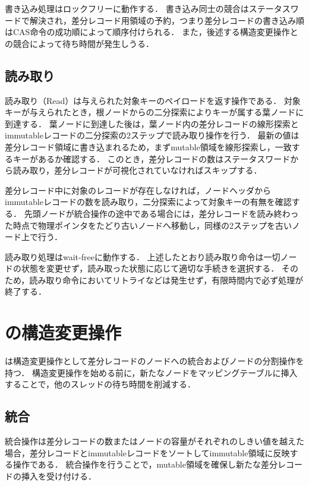 書き込み処理はロックフリーに動作する．
書き込み同士の競合はステータスワードで解決され，差分レコード用領域の予約，つまり差分レコードの書き込み順はCAS命令の成功順によって順序付けられる．
また，後述する構造変更操作との競合によって待ち時間が発生しうる．

\subsection{読み取り}

読み取り（Read）は与えられた対象キーのペイロードを返す操作である．
対象キーが与えられたとき，根ノードからの二分探索によりキーが属する葉ノードに到達する．
葉ノードに到達した後は，葉ノード内の差分レコードの線形探索とimmutableレコードの二分探索の2ステップで読み取り操作を行う．
最新の値は差分レコード領域に書き込まれるため，まずmutable領域を線形探索し，一致するキーがあるか確認する．
このとき，差分レコードの数はステータスワードから読み取り，差分レコードが可視化されていなければスキップする．

差分レコード中に対象のレコードが存在しなければ，ノードヘッダからimmutableレコードの数を読み取り，二分探索によって対象キーの有無を確認する．
先頭ノードが統合操作の途中である場合には，差分レコードを読み終わった時点で物理ポインタをたどり古いノードへ移動し，同様の2ステップを古いノード上で行う．

読み取り処理はwait-freeに動作する．
上述したとおり読み取り命令は一切ノードの状態を変更せず，読み取った状態に応じて適切な手続きを選択する．
そのため，読み取り命令においてリトライなどは発生せず，有限時間内で必ず処理が終了する．

\section{\Bctree{}の構造変更操作}
\label{sec:smo}

\Bctree{}は構造変更操作として差分レコードのノードへの統合およびノードの分割操作を持つ．
構造変更操作を始める前に，新たなノードをマッピングテーブルに挿入することで，他のスレッドの待ち時間を削減する．

\subsection{統合}

統合操作は差分レコードの数またはノードの容量がそれぞれのしきい値を越えた場合，差分レコードとimmutableレコードをソートしてimmutable領域に反映する操作である．
統合操作を行うことで，mutable領域を確保し新たな差分レコードの挿入を受け付ける．

